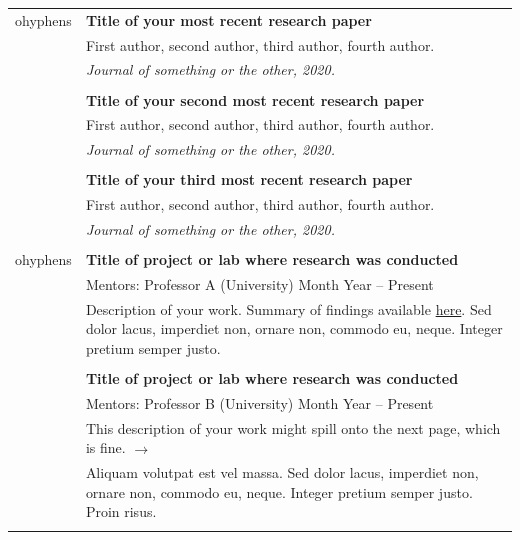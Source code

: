 \documentclass[letterpaper, 11pt]{article}
\begin{document}
\begin{longtable}{p{1.3in}p{4.8in}}

ohyphens{\color{OliveGreen}{Publications}} 
& \textbf{Title of your most recent research paper} \\
& First author, second author, third author, fourth author. \\
& \textit{Journal of something or the other, 2020.}\\
& \\

& \textbf{Title of your second most recent research paper} \\
& First author, second author, third author, fourth author. \\
& \textit{Journal of something or the other, 2020.}\\
& \\

& \textbf{Title of your third most recent research paper} \\
& First author, second author, third author, fourth author. \\
& \textit{Journal of something or the other, 2020.}\\
& \\



ohyphens{\color{OliveGreen}{Research experience}} 
& \textbf{Title of project or lab where research was conducted} \\
& Mentors: Professor A (University) \hfill Month Year -- Present \\
& Description of your work. Summary of findings available \href{https://en.wikibooks.org/wiki/LaTeX/Hyperlinks}{here}. Sed dolor lacus, imperdiet non, ornare non, commodo eu, neque. Integer pretium semper justo. \\
& \\

& \textbf{Title of project or lab where research was conducted} \\
& Mentors: Professor B (University) \hfill Month Year -- Present \\
& This description of your work might spill onto the next page, which is fine. \hfill $\rightarrow$ \\
& Aliquam volutpat est vel massa. Sed dolor lacus, imperdiet non, ornare non, commodo eu, neque. Integer pretium semper justo. Proin risus. \\
& \\



\end{longtable}
\end{document}

